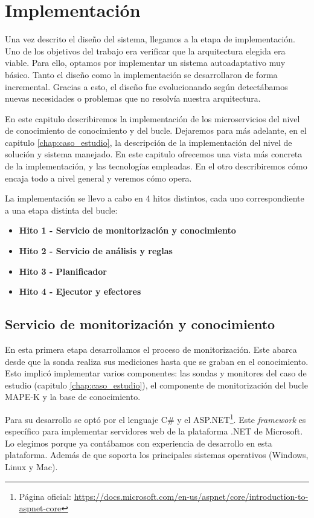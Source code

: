 
\chapter{Implementación}
\label{chap:implementación}

Una vez descrito el diseño del sistema, llegamos a la etapa de implementación. Uno de los objetivos del trabajo era verificar que la arquitectura elegida era viable. Para ello, optamos por implementar un sistema autoadaptativo muy básico. Tanto el diseño como la implementación se desarrollaron de forma incremental. Gracias a esto, el diseño fue evolucionando según detectábamos nuevas necesidades o problemas que no resolvía nuestra arquitectura.

En este capitulo describiremos la implementación de los microservicios del nivel de conocimiento de conocimiento y del bucle. Dejaremos para más adelante, en el capitulo \ref{chap:caso_estudio}, la descripción de la implementación del nivel de solución y sistema manejado. En este capitulo ofrecemos una vista más concreta de la implementación, y las tecnologías empleadas. En el otro describiremos cómo encaja todo a nivel general y veremos cómo opera.

La implementación se llevo a cabo en 4 hitos distintos, cada uno correspondiente a una etapa distinta del bucle:

\begin{itemize}
  \item \textbf{Hito 1 - Servicio de monitorización y conocimiento}
  \item \textbf{Hito 2 - Servicio de análisis y reglas}
  \item \textbf{Hito 3 - Planificador}
  \item \textbf{Hito 4 - Ejecutor y efectores}
\end{itemize}

\section{Servicio de monitorización y conocimiento}

En esta primera etapa desarrollamos el proceso de monitorización. Este abarca desde que la sonda realiza sus mediciones hasta que se graban en el conocimiento. Esto implicó implementar varios componentes: las sondas y monitores del caso de estudio (capitulo \ref{chap:caso_estudio}), el componente de monitorización del bucle MAPE-K y la base de conocimiento.

Para su desarrollo se optó por el lenguaje C\# y el  ASP.NET\footnote{Página oficial: \url{https://docs.microsoft.com/en-us/aspnet/core/introduction-to-aspnet-core}}. Este \emph{framework} es específico para implementar servidores web de la plataforma .NET de Microsoft. Lo elegimos porque ya contábamos con experiencia de desarrollo en esta plataforma. Además de que soporta los principales sistemas operativos (Windows, Linux y Mac).


